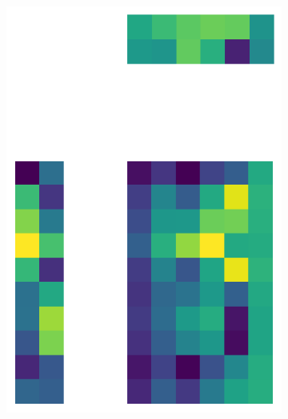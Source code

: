 \documentclass[10pt,twocolumn]{article}
\begin{document}
\begin{figure}[H]
\begin{subfigure}[t]{.15\textwidth}
\includegraphics[scale=.2]{semi-structured-matrix-reconstruction-PCs-2.png}
\caption{ }
\end{subfigure}
\begin{subfigure}[t]{.15\textwidth}
\centering

\end{subfigure}
\end{figure}
\end{document}
